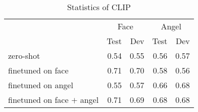 \begin{table}[htb!]
\begin{minipage}{1\textwidth}
\begin{center}
{\small
\begin{tabular}{lrrrr}
\toprule
& \multicolumn{2}{c}{Face} & \multicolumn{2}{c}{Angel}\\
~ & Test & Dev & Test & Dev \\
\midrule
zero-shot & 0.54 & 0.55 & 0.56 & 0.57 \\
finetuned on face & 0.71 & 0.70 & 0.58 & 0.56 \\
finetuned on angel & 0.55 & 0.57 & 0.66 & 0.68 \\
finetuned on face $+$ angel & 0.71 & 0.69 & 0.68 & 0.68\\
\bottomrule
\end{tabular}}
\caption{Statistics of CLIP}
\label{clip_results_table.single_acc}
\end{center}
\end{minipage}
\end{table}
